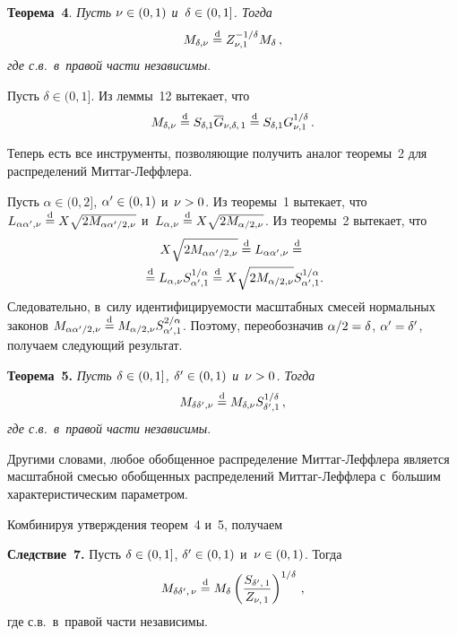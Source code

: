 \begin{multicols}{2}
\smallskip

\noindent
\textbf{Теорема~4}. \textit{Пусть $\nu\hm\in(0,1)$ и~$\delta\hm\in(0,1]$. Тогда}
$$
M_{\delta,\nu}\stackrel{\mathrm{d}}{=} Z_{\nu,1}^{-1/\delta} M_{\delta}\,,
$$ \textit{где с.в.\  в~правой части независимы}.

\smallskip

Пусть $\delta\in(0,1]$. Из леммы~12 вытекает, что
$$
M_{\delta,\nu}\stackrel{\mathrm{d}}{=} S_{\delta,1} \overline{G}_{\nu,\delta,\,1}\stackrel{\mathrm{d}}{=}
S_{\delta,1} G_{\nu,1}^{1/\delta}\,.
$$

 Теперь есть все
инструменты, позволяющие получить аналог теоремы~2 для распределений
Мит\-таг-Леф\-флера.

Пусть $\alpha\in(0,2]$, $\alpha'\hm\in(0,1)$ и~$\nu\hm>0$. Из тео\-ремы~1
вытекает, что $L_{\alpha\alpha',\nu}\stackrel{\mathrm{d}}{=}
X\sqrt{2M_{\alpha\alpha'/2,\nu}}$ и~$L_{\alpha,\nu}\stackrel{\mathrm{d}}{=}
X\sqrt{2M_{\alpha/2,\nu}}$. Из теоремы~2 вытекает, что
\begin{multline*}
X\sqrt{2M_{\alpha\alpha'/2,\nu}}\stackrel{\mathrm{d}}{=}
L_{\alpha\alpha',\nu}\stackrel{\mathrm{d}}{=}{}\\
{}\stackrel{\mathrm{d}}{=} L_{\alpha,\nu}
S_{\alpha',1}^{1/\alpha}\stackrel{\mathrm{d}}{=} X\sqrt{2M_{\alpha/2,\nu}}
S_{\alpha',1}^{1/\alpha}.
\end{multline*}
Следовательно, в~силу идентифицируемости масштабных смесей
нормальных законов $M_{\alpha\alpha'/2,\nu}\hm\eqd
M_{\alpha/2,\nu} S_{\alpha',1}^{2/\alpha}$. Поэтому,
переобозначив $\alpha/2\hm=\delta$, $\alpha'\hm=\delta'$, получаем
следующий результат.

\smallskip

\noindent
\textbf{Теорема~5.} \textit{Пусть $\delta\hm\in(0,1]$, $\delta'\hm\in(0,1)$ 
и~$\nu\hm>0$. Тогда}
$$
M_{\delta\delta',\nu}\stackrel{\mathrm{d}}{=} M_{\delta,\nu}
S_{\delta',1}^{1/\delta}\,,
$$
\textit{где с.в.\ в~правой части независимы}.

\smallskip

Другими словами, любое обобщенное распределение Мит\-таг-Леф\-фле\-ра
является масштабной \mbox{смесью} обобщенных распределений Мит\-таг-Леф\-фле\-ра
с~б$\acute{\mbox{о}}$льшим характеристическим параметром.

\smallskip

Комбинируя утверждения теорем~4 и~5, по\-лу\-чаем

\smallskip

\noindent
\textbf{Следствие~7.} Пусть $\delta\hm\in(0,1]$, $\delta'\hm\in(0,1)$ 
и~$\nu\hm\in(0,1)$. Тогда
$$
M_{\delta\delta',\,\nu}\stackrel{\mathrm{d}}{=} M_{\delta}
\left(\displaystyle\frac{\displaystyle S_{\delta',\,1}\mathstrut}{\displaystyle Z_{\nu,\,1}\mathstrut}\right)^{1/\delta}\,,
$$
где с.в.\ в~правой части независимы.


\end{multicols}
